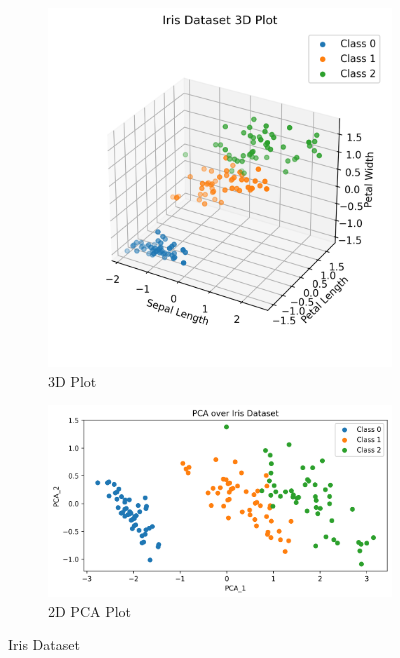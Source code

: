 \begin{figure}[H]
\begin{subfigure}{.5\textwidth}
    \center
    \includegraphics[scale=0.45]{notebooks/ML/img/3d_iris.png}
    \caption{3D Plot}
\end{subfigure}%
\begin{subfigure}{.5\textwidth}
    \center
    \includegraphics[scale=0.4]{notebooks/ML/img/pca_over_iris.png}
    \caption{2D PCA Plot}
\end{subfigure}
\caption{Iris Dataset}
\end{figure}

